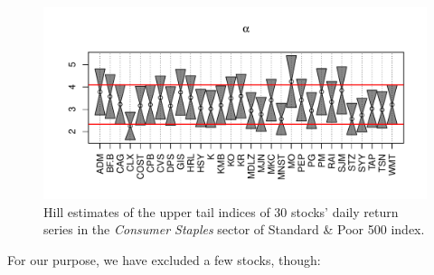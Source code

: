\documentclass{article}
\newcommand{\1}[1]{
  \mathbf{1}_{\{#1\}}
}
\begin{document}
\begin{figure}[htb!]
  \centering
  \includegraphics[width=\textwidth]{Consumer_Staples_Hill_upper.pdf}
  \caption{Hill estimates of the upper tail indices of 30 stocks'
    daily return series in the {\it Consumer Staples} sector of
    Standard \& Poor 500 index.
  }
  \label{fig:Consumer_Staples_Hill_upper}
\end{figure}
For our purpose, we have excluded a few stocks, though:
\end{document}

